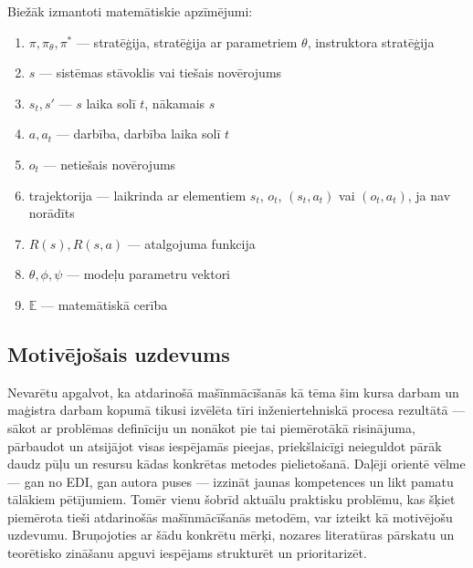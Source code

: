 \documentclass[12pt, a4paper]{article}
\numberwithin{equation}{section} %
\begin{document}
Biežāk izmantoti matemātiskie apzīmējumi:

\begin{enumerate}
    \item $\pi, \pi_{\theta}, \pi^*$ --- stratēģija, stratēģija ar parametriem $\theta$, instruktora stratēģija
    \item $s$ --- sistēmas stāvoklis vai tiešais novērojums
    \item $s_t, s'$ --- $s$ laika solī $t$, nākamais $s$
    \item $a, a_t$ --- darbība, darbība laika solī $t$
    \item $o_t$ --- netiešais novērojums
    \item trajektorija --- laikrinda ar elementiem $s_t$, $o_t$, $(s_t, a_t)$ vai $(o_t, a_t)$, ja nav norādīts
    \item $R(s), R(s,a)$ --- atalgojuma funkcija
    \item $\theta, \phi, \psi$ --- modeļu parametru vektori
    \item $\mathbb{E}$ --- matemātiskā cerība
\end{enumerate}


\subsection*{Motivējošais uzdevums} %

Nevarētu apgalvot, ka atdarinošā mašīnmācīšanās kā tēma šim kursa darbam un maģistra darbam kopumā tikusi izvēlēta tīri inženiertehniskā procesa rezultātā --- sākot ar problēmas definīciju un nonākot pie tai piemērotākā risinājuma, pārbaudot un atsijājot visas iespējamās pieejas, priekšlaicīgi neieguldot pārāk daudz pūļu un resursu kādas konkrētas metodes pielietošanā. Daļēji orientē vēlme --- gan no EDI, gan autora puses --- izzināt jaunas kompetences un likt pamatu tālākiem pētījumiem. Tomēr vienu šobrīd aktuālu praktisku problēmu, kas šķiet piemērota tieši atdarinošās mašīnmācīšanās metodēm, var izteikt kā motivējošu uzdevumu. Bruņojoties ar šādu konkrētu mērķi, nozares literatūras pārskatu un teorētisko zināšanu apguvi iespējams strukturēt un prioritarizēt.
\end{document}
